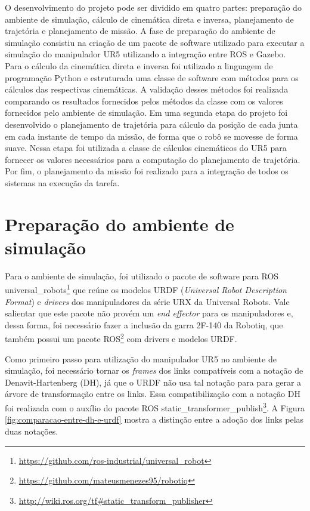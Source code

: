O desenvolvimento do projeto pode ser dividido em quatro partes: preparação do ambiente
de simulação, cálculo de cinemática direta e inversa, planejamento de trajetória e planejamento de 
missão. A fase de preparação do ambiente de simulação consistiu na criação de um pacote de software
utilizado para executar a simulação do manipulador UR5 utilizando a integração entre ROS e Gazebo.
Para o cálculo da cinemática direta e inversa foi utilizado a linguagem de programação Python e
estruturada uma classe de software com métodos para os cálculos das respectivas cinemáticas.
A validação desses métodos foi realizada comparando os resultados fornecidos pelos métodos da classe
com os valores fornecidos pelo ambiente de simulação. Em uma segunda etapa do projeto foi desenvolvido
o planejamento de trajetória para cálculo da posição de cada junta em cada instante de tempo da missão,
de forma que o robô se movesse de forma suave. Nessa etapa foi utilizada a classe de cálculos 
cinemáticos do UR5 para fornecer os valores necessários para a computação do planejamento de trajetória.
Por fim, o planejamento da missão foi realizado para a integração de todos os sistemas
na execução da tarefa.

\section{Preparação do ambiente de simulação}
Para o ambiente de simulação, foi utilizado o pacote de software para ROS 
universal\_robots\footnote{\url{https://github.com/ros-industrial/universal\_robot}} que reúne os modelos
URDF (\textit{Universal Robot Description Format}) e \textit{drivers} dos manipuladores da série
URX da Universal Robots. Vale salientar que este pacote não provém um \textit{end effector} para
os manipuladores e, dessa forma, foi necessário fazer a inclusão da garra 2F-140 da Robotiq, que
também possui um pacote ROS\footnote{\url{https://github.com/mateusmenezes95/robotiq}} com drivers
e modelos URDF.

Como primeiro passo para utilização do manipulador UR5 no ambiente de simulação, foi necessário tornar
os \textit{frames} dos links compatíveis com a notação de Denavit-Hartenberg (DH), já que o URDF não usa tal
notação para para gerar a árvore de transformação entre os links. Essa compatibilização com a notação DH
foi realizada com o auxílio do pacote ROS
static\_transformer\_publish\footnote{\url{http://wiki.ros.org/tf\#static\_transform_publisher}}.
A Figura \ref{fig:comparacao-entre-dh-e-urdf} mostra a distinção entre a adoção dos links
pelas duas notações.

